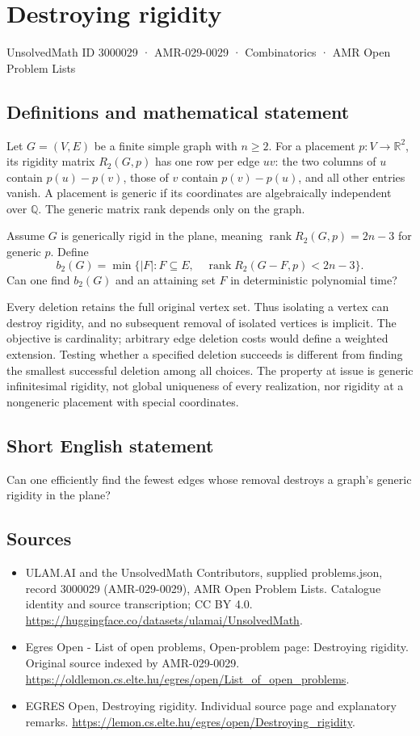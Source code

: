 \documentclass[11pt,a4paper]{article}
\begin{document}
\section*{Destroying rigidity}\label{3000029}
{\small UnsolvedMath ID 3000029 · AMR-029-0029 · Combinatorics · AMR Open Problem Lists}
\subsection{Definitions and mathematical statement}
Let $G=(V,E)$ be a finite simple graph with $n\ge2$. For a placement
$p:V\to\mathbb R^2$, its rigidity matrix $R_2(G,p)$ has one row per
edge $uv$: the two columns of $u$ contain $p(u)-p(v)$, those of $v$
contain $p(v)-p(u)$, and all other entries vanish. A placement is generic
if its coordinates are algebraically independent over $\mathbb Q$.
The generic matrix rank depends only on the graph.

Assume $G$ is generically rigid in the plane, meaning
$\operatorname{rank}R_2(G,p)=2n-3$ for generic $p$. Define
\[
 b_2(G)=\min\{|F|:F\subseteq E,\quad
        \operatorname{rank}R_2(G-F,p)<2n-3\}.
\]
Can one find $b_2(G)$ and an attaining set $F$ in deterministic
polynomial time?

Every deletion retains the full original vertex set. Thus isolating
a vertex can destroy rigidity, and no subsequent removal of isolated
vertices is implicit. The objective is cardinality; arbitrary edge
deletion costs would define a weighted extension. Testing whether a
specified deletion succeeds is different from finding the smallest
successful deletion among all choices. The property at issue is generic
infinitesimal rigidity, not global uniqueness of every realization,
nor rigidity at a nongeneric placement with special coordinates.
\subsection{Short English statement}
Can one efficiently find the fewest edges whose removal destroys
a graph's generic rigidity in the plane?
\subsection{Sources}
\begin{itemize}
\item[S1] ULAM.AI and the UnsolvedMath Contributors, supplied problems.json, record 3000029 (AMR-029-0029), AMR Open Problem Lists. Catalogue identity and source transcription; CC BY 4.0.
\url{https://huggingface.co/datasets/ulamai/UnsolvedMath}.
\item[S2] Egres Open - List of open problems, Open-problem page: Destroying rigidity. Original source indexed by AMR-029-0029.
\url{https://oldlemon.cs.elte.hu/egres/open/List_of_open_problems}.
\item[S3] EGRES Open, Destroying rigidity. Individual source page and explanatory remarks.
\url{https://lemon.cs.elte.hu/egres/open/Destroying_rigidity}.
\end{itemize}
\end{document}
